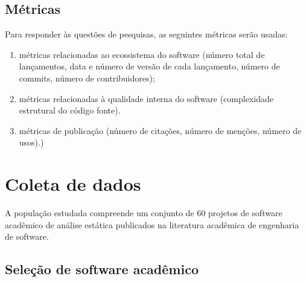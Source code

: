 
\subsection{Métricas}

Para responder às questões de pesquisas, as seguintes métricas serão usadas:
\begin{enumerate}
\item métricas relacionadas ao ecossistema do software (número
total de lançamentos, data e número de versão de cada lançamento, número de
commits, número de contribuidores);
\item métricas relacionadas à qualidade interna do software (complexidade estrutural do código fonte).
\item métricas de publicação (número de citações, número de menções, número de usos).)
\end{enumerate}



\section{Coleta de dados} \label{sec:study1:operation}

A população estudada compreende um conjunto de 60 projetos de software
acadêmico de análise estática publicados na literatura acadêmica de engenharia
de software.

\subsection{Seleção de software acadêmico}

